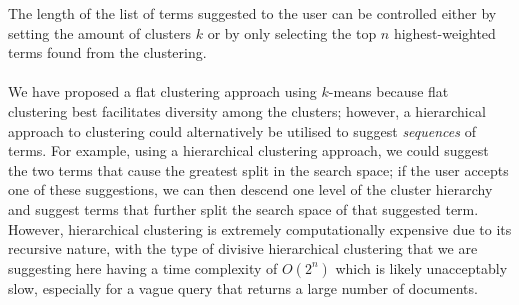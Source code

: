 \documentclass[a4paper]{article}
\begin{document}
The length of the list of terms suggested to the user can be controlled either by setting the amount of clusters $k$ or by only selecting the top $n$ highest-weighted terms found from the clustering.
\\\\
We have proposed a flat clustering approach using $k$-means because flat clustering best facilitates diversity among the clusters;
however, a hierarchical approach to clustering could alternatively be utilised to suggest \textit{sequences} of terms.
For example, using a hierarchical clustering approach, we could suggest the two terms that cause the greatest split in the search space; if the user accepts one of these suggestions, we can then descend one level of the cluster hierarchy and suggest terms that further split the search space of that suggested term.
However, hierarchical clustering is extremely computationally expensive due to its recursive nature, with the type of divisive hierarchical clustering that we are suggesting here having a time complexity of $O(2^n)$ which is likely unacceptably slow, especially for a vague query that returns a large number of documents.
\end{document}
